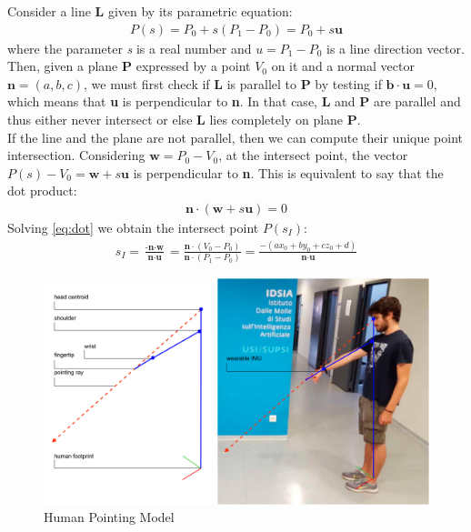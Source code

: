 Consider a line \textbf{L} given by its parametric equation:
\begin{align}
	P(s)= P_0 +s(P_1-P_0)= P_0+s\textbf{u}
\end{align}
where the parameter \emph{s} is a real number and $u=P_1-P_0$ is a line direction vector. Then, given a plane \textbf{P} expressed by a point $V_0$ on it and a normal vector $\textbf{n}=(a,b,c)$, we must first check if \textbf{L} is parallel to \textbf{P} by testing if $\textbf{b}\cdot\textbf{u}=0$, which means that \textbf{u} is perpendicular to \textbf{n}. In that case, \textbf{L} and \textbf{P} are parallel and thus either never intersect or else \textbf{L} lies completely on plane \textbf{P}.\\
If the line and the plane are not parallel, then we can compute their unique point intersection. Considering $\textbf{w} = P_0-V_0$, at the intersect point, the vector $P(s)-V_0=\textbf{w}+s\textbf{u}$ is perpendicular to \textbf{n}. This is equivalent to say that the dot product:
\begin{align}
	\textbf{n}\cdot(\textbf{w}+s\textbf{u})=0 \label{eq:dot}
\end{align}
Solving \ref{eq:dot} we obtain the intersect point $P(s_I)$:
\begin{align}\label{eq:intersection}
	s_I = \frac{\textbf{-n}\cdot\textbf{w}}{\textbf{n}\cdot\textbf{u}}=\frac{\textbf{n}\cdot(V_0-P_0)}{\textbf{n}\cdot(P_1-P_0)}=\frac{-(ax_0+by_0+cz_0+d)}{\textbf{n}\cdot\textbf{u}}
\end{align}
\begin{figure}
	\centering
	\includegraphics[width=\textwidth]{img/gabryPointing.png}%
	\caption{Human Pointing Model}
	\label{fig:pointingModel}
\end{figure}
